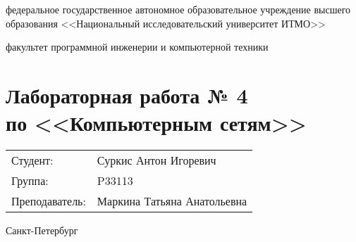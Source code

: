 \begin{titlepage}
    \begin{center}
        федеральное государственное автономное образовательное учреждение высшего образования
        <<Национальный исследовательский университет ИТМО>>

        \bigskip

        факультет программной инженерии и компьютерной техники

        \vfill

        \section*{Лабораторная работа № 4 \\
        по <<Компьютерным сетям>>}

        \bigskip

        \begin{flushright}
            \begin{tabular}{ll}
                Студент: & Суркис Антон Игоревич \\
                Группа: & P33113 \\
                Преподаватель: & Маркина Татьяна Анатольевна \\
            \end{tabular}
        \end{flushright}

        \vfill

        Санкт-Петербург

        \the\year
    \end{center}
\end{titlepage}
